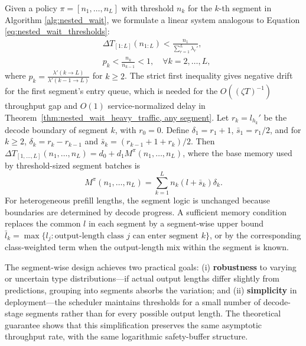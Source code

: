 Given a policy $\pi=[n_1,\dots,n_L]$ with threshold $n_k$ for the $k$-th segment in Algorithm \ref{alg:nested_wait}, we formulate a linear system analogous to Equation \eqref{eq:nested_wait_thresholds}:
\begin{equation}          \label{eq:nested_wait_thresholds_L}
    \begin{aligned}
    &\Delta T_{[1:L]}(n_{1:L}) < \frac{n_1}{\sum_{r=1}^L \lambda_r'},  \\
    &p_k < \frac{n_k}{n_{k-1}} < 1,\quad \forall k=2,\dots,L,
    \end{aligned}
\end{equation}
where $p_k =\frac{\lambda'(k \to L)}{\lambda'(k-1 \to L)}$ for \(k\ge2\). The strict first inequality gives negative drift for the first segment's entry queue, which is needed for the \(O((\zeta T)^{-1})\) throughput gap and \(O(1)\) service-normalized delay in Theorem~\ref{thm:nested_wait_heavy_traffic, any segment}. Let \(r_k=l_{h_k}'\) be the decode boundary of segment \(k\), with \(r_0=0\). Define \(\delta_1=r_1+1\), \(\bar s_1=r_1/2\), and for \(k\ge2\), \(\delta_k=r_k-r_{k-1}\) and \(\bar s_k=(r_{k-1}+1+r_k)/2\). Then \(\Delta T_{[1,\dots,L]}(n_1,\dots,n_L)=d_0+d_1M^\pi(n_1,\dots,n_L)\), where the base memory used by threshold-sized segment batches is
\[
M^{\pi}(n_1, \dots, n_L) = \sum_{k=1}^L n_k (l+\bar s_k)\delta_k.
\]
For heterogeneous prefill lengths, the segment logic is unchanged because boundaries are determined by decode progress. A sufficient memory condition replaces the common \(l\) in each segment by a segment-wise upper bound \(\bar l_k=\max\{l_j: \text{output-length class }j\text{ can enter segment }k\}\), or by the corresponding class-weighted term when the output-length mix within the segment is known.

The segment-wise design achieves two practical goals: (i) \textbf{robustness} to varying or uncertain type distributions---if actual output lengths differ slightly from predictions, grouping into segments absorbs the variation; and (ii) \textbf{simplicity} in deployment---the scheduler maintains thresholds for a small number of decode-stage segments rather than for every possible output length. The theoretical guarantee shows that this simplification preserves the same asymptotic throughput rate, with the same logarithmic safety-buffer structure.

